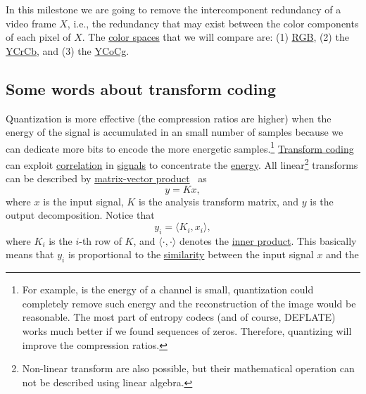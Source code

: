 In this milestone we are going to remove the intercomponent redundancy
of a video frame $X$, i.e., the redundancy that may exist between the
color components of each pixel of $X$. The
\href{https://en.wikipedia.org/wiki/Color_space}{color spaces} that we
will compare are: (1)
\href{https://en.wikipedia.org/wiki/RGB_color_model}{RGB}, (2) the
\href{https://en.wikipedia.org/wiki/YCbCr}{YCrCb}, and (3) the
\href{https://en.wikipedia.org/wiki/YCoCg}{YCoCg}.

\subsection{Some words about transform coding}
Quantization is more effective (the compression ratios are higher)
when the energy of the signal is accumulated in an small number of
samples because we can dedicate more bits to encode the more energetic
samples.\footnote{For example, is the energy of a channel is small,
quantization could completely remove such energy and the
reconstruction of the image would be reasonable. The most part of
entropy codecs (and of course, DEFLATE) works much better if we found
sequences of zeros. Therefore, quantizing will improve the compression
ratios.}
\href{https://web.stanford.edu/class/ee398a/handouts/lectures/07-TransformCoding.pdf}{Transform
  coding} can exploit
\href{https://en.wikipedia.org/wiki/Correlation_and_dependence}{correlation}
in \href{https://en.wikipedia.org/wiki/Signal}{signals} to concentrate
the
\href{https://en.wikipedia.org/wiki/Energy_(signal_processing)}{energy}.
All linear\footnote{Non-linear transform are also possible, but their
mathematical operation can not be described using linear algebra.}
transforms can be described by
\href{https://en.wikipedia.org/wiki/Matrix_multiplication}{matrix-vector
  product}~\cite{strang4linear} as
\begin{equation}
  y = Kx,
  \label{eq:forward_transform_matrix_form}
\end{equation}
where $x$ is the input signal, $K$ is the analysis transform matrix,
and $y$ is the output decomposition. Notice that
\begin{equation}
  y_i = \langle K_i, x_i\rangle,
\end{equation}
where $K_i$ is the $i$-th row of $K$, and $\langle\cdot,\cdot\rangle$
denotes the
\href{https://mathworld.wolfram.com/InnerProduct.html}{inner
  product}. This basically means that $y_i$ is proportional to the
\href{https://en.wikipedia.org/wiki/Similarity_(geometry)}{similarity}
between the input signal $x$ and the
